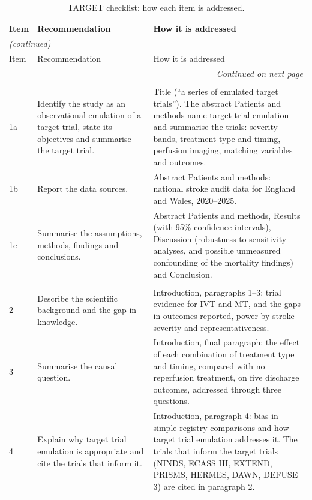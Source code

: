 {\small
\begin{longtable}{p{1.0cm} p{4.6cm} p{10.4cm}}
\caption{TARGET checklist: how each item is addressed.}\label{tab:supp_target}\\
\toprule
Item & Recommendation & How it is addressed \\
\midrule
\endfirsthead
\multicolumn{3}{l}{\textit{(continued)}}\\
\toprule
Item & Recommendation & How it is addressed \\
\midrule
\endhead
\midrule
\multicolumn{3}{r}{\textit{Continued on next page}}\\
\endfoot
\bottomrule
\endlastfoot
\multicolumn{3}{l}{\textbf{Abstract}}\\
1a & Identify the study as an observational emulation of a target trial, state its objectives and summarise the target trial. & Title (``a series of emulated target trials''). The abstract Patients and methods name target trial emulation and summarise the trials: severity bands, treatment type and timing, perfusion imaging, matching variables and outcomes. \\
1b & Report the data sources. & Abstract Patients and methods: national stroke audit data for England and Wales, 2020--2025. \\
1c & Summarise the assumptions, methods, findings and conclusions. & Abstract Patients and methods, Results (with 95\% confidence intervals), Discussion (robustness to sensitivity analyses, and possible unmeasured confounding of the mortality findings) and Conclusion. \\
\addlinespace
\multicolumn{3}{l}{\textbf{Introduction}}\\
2 & Describe the scientific background and the gap in knowledge. & Introduction, paragraphs 1--3: trial evidence for IVT and MT, and the gaps in outcomes reported, power by stroke severity and representativeness. \\
3 & Summarise the causal question. & Introduction, final paragraph: the effect of each combination of treatment type and timing, compared with no reperfusion treatment, on five discharge outcomes, addressed through three questions. \\
4 & Explain why target trial emulation is appropriate and cite the trials that inform it. & Introduction, paragraph 4: bias in simple registry comparisons and how target trial emulation addresses it. The trials that inform the target trials (NINDS, ECASS III, EXTEND, PRISMS, HERMES, DAWN, DEFUSE 3) are cited in paragraph 2. \\

\end{longtable}}
